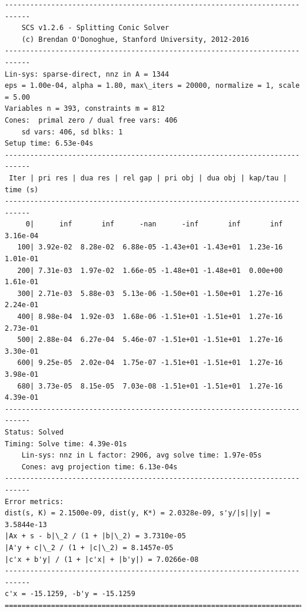 \documentclass[11pt]{article}
\begin{document}
    \begin{Verbatim}[commandchars=\\\{\}]
----------------------------------------------------------------------------
	SCS v1.2.6 - Splitting Conic Solver
	(c) Brendan O'Donoghue, Stanford University, 2012-2016
----------------------------------------------------------------------------
Lin-sys: sparse-direct, nnz in A = 1344
eps = 1.00e-04, alpha = 1.80, max\_iters = 20000, normalize = 1, scale = 5.00
Variables n = 393, constraints m = 812
Cones:	primal zero / dual free vars: 406
	sd vars: 406, sd blks: 1
Setup time: 6.53e-04s
----------------------------------------------------------------------------
 Iter | pri res | dua res | rel gap | pri obj | dua obj | kap/tau | time (s)
----------------------------------------------------------------------------
     0|      inf       inf      -nan      -inf       inf       inf  3.16e-04 
   100| 3.92e-02  8.28e-02  6.88e-05 -1.43e+01 -1.43e+01  1.23e-16  1.01e-01 
   200| 7.31e-03  1.97e-02  1.66e-05 -1.48e+01 -1.48e+01  0.00e+00  1.61e-01 
   300| 2.71e-03  5.88e-03  5.13e-06 -1.50e+01 -1.50e+01  1.27e-16  2.24e-01 
   400| 8.98e-04  1.92e-03  1.68e-06 -1.51e+01 -1.51e+01  1.27e-16  2.73e-01 
   500| 2.88e-04  6.27e-04  5.46e-07 -1.51e+01 -1.51e+01  1.27e-16  3.30e-01 
   600| 9.25e-05  2.02e-04  1.75e-07 -1.51e+01 -1.51e+01  1.27e-16  3.98e-01 
   680| 3.73e-05  8.15e-05  7.03e-08 -1.51e+01 -1.51e+01  1.27e-16  4.39e-01 
----------------------------------------------------------------------------
Status: Solved
Timing: Solve time: 4.39e-01s
	Lin-sys: nnz in L factor: 2906, avg solve time: 1.97e-05s
	Cones: avg projection time: 6.13e-04s
----------------------------------------------------------------------------
Error metrics:
dist(s, K) = 2.1500e-09, dist(y, K*) = 2.0328e-09, s'y/|s||y| = 3.5844e-13
|Ax + s - b|\_2 / (1 + |b|\_2) = 3.7310e-05
|A'y + c|\_2 / (1 + |c|\_2) = 8.1457e-05
|c'x + b'y| / (1 + |c'x| + |b'y|) = 7.0266e-08
----------------------------------------------------------------------------
c'x = -15.1259, -b'y = -15.1259
============================================================================

    \end{Verbatim}
\end{document}
